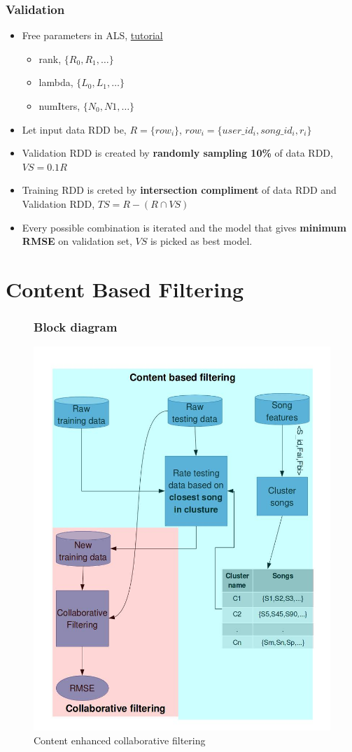 \documentclass[11pt]{beamer}
\begin{document}
\begin{frame}
  \frametitle{Validation}
  \begin{itemize}
    \item Free parameters in ALS, \href{'http://spark.apache.org/docs/latest/mllib-collaborative-filtering.html'}{tutorial}
      \begin{itemize}
        \item rank, $\{R_0,R_1,\dots\}$
        \item lambda, $\{L_0,L_1,\dots\}$
        \item numIters, $\{N_0,N1,\dots\}$
      \end{itemize}
    \item Let input data RDD be, $R = \{row_i\}$, $row_i = \{user\_id_i, song\_id_i, r_i\}$
    \item Validation RDD is created by {\bf randomly sampling 10\%} of data RDD, $VS = 0.1R$
      \item Training RDD is creted by {\bf intersection compliment} of data RDD and Validation RDD,
        $TS = R - (R \cap VS)$
      \item Every possible combination is iterated and the model that gives {\bf minimum RMSE} on
        validation set, $VS$ is picked as best model.
    \end{itemize}
  \end{frame}

  \section{Content Based Filtering}
  \begin{frame}
    \begin{figure}[!h]
      \frametitle{Block diagram}
      \centering
      \includegraphics[width=0.5\linewidth]{figures/contentBasedBlockDiag.jpg}
      \caption{ Content enhanced collaborative filtering}
    \end{figure}
  \end{frame}
\end{document}
